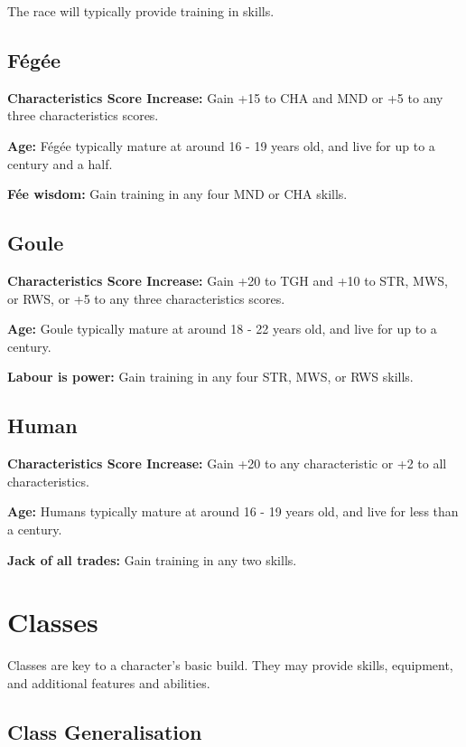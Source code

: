 \documentclass[]{article}
\begin{document}
The race will typically provide training in skills.

\subsection{Fégée}\label{fuxe9guxe9e}

\textbf{Characteristics Score Increase:} Gain +15 to CHA and MND or +5
to any three characteristics scores.

\textbf{Age:} Fégée typically mature at around 16 - 19 years old, and
live for up to a century and a half.

\textbf{Fée wisdom:} Gain training in any four MND or CHA skills.

\subsection{Goule}\label{goule}

\textbf{Characteristics Score Increase:} Gain +20 to TGH and +10 to STR,
MWS, or RWS, or +5 to any three characteristics scores.

\textbf{Age:} Goule typically mature at around 18 - 22 years old, and
live for up to a century.

\textbf{Labour is power:} Gain training in any four STR, MWS, or RWS
skills.

\subsection{Human}\label{human}

\textbf{Characteristics Score Increase:} Gain +20 to any characteristic
or +2 to all characteristics.

\textbf{Age:} Humans typically mature at around 16 - 19 years old, and
live for less than a century.

\textbf{Jack of all trades:} Gain training in any two skills.

\section{Classes}\label{classes}

Classes are key to a character's basic build. They may provide skills,
equipment, and additional features and abilities.

\subsection{Class Generalisation}\label{class-generalisation}
\end{document}
